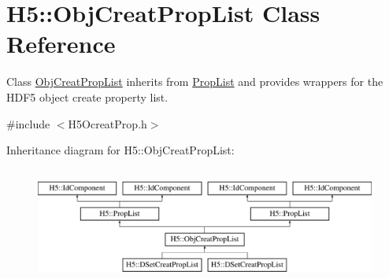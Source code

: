 \hypertarget{class_h5_1_1_obj_creat_prop_list}{}\section{H5\+:\+:Obj\+Creat\+Prop\+List Class Reference}
\label{class_h5_1_1_obj_creat_prop_list}


Class \hyperlink{class_h5_1_1_obj_creat_prop_list}{Obj\+Creat\+Prop\+List} inherits from \hyperlink{class_h5_1_1_prop_list}{Prop\+List} and provides wrappers for the H\+D\+F5 object create property list.  




{\ttfamily \#include $<$H5\+Ocreat\+Prop.\+h$>$}

Inheritance diagram for H5\+:\+:Obj\+Creat\+Prop\+List\+:\begin{figure}[H]
\begin{center}
\leavevmode
\includegraphics[height=3.835616cm]{class_h5_1_1_obj_creat_prop_list}
\end{center}
\end{figure}
